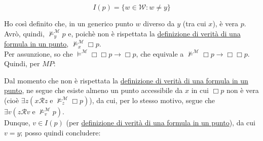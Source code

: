 \documentclass[a4paper,12pt]{article}
\begin{document}
\begin{dimo}
\begin{enumerate}
		      \begin{minipage}{0.48\textwidth}
			      $$I(p) = \{w \in \mathcal{W} : w \neq y\}$$
		      \end{minipage}
		      \begin{minipage}{0.48\textwidth}
			      \begin{center}
			      \end{center}
		      \end{minipage}
		      \vspace{8pt}

		      Ho così definito che, in un generico punto $w$ diverso da $y$ (tra cui $x$), è vera $p$. Avrò, quindi, $\nvDash_y^{\mathcal{M}} p$ e, poichè non è rispettata la \hyperlink{defverp}{definizione di verità di una formula in un punto}, $\nvDash_x^{\mathcal{M}} \Box p$. \\
		      Per assunzione, so che $\vDash^{\mathcal{M}}\Box \Box p \to \Box p$, che equivale a $\nvDash^{\mathcal{M}}\Box p \to \Box \Box p$. Quindi, per $M \! P$:
		      \begin{mathpar}
		      \end{mathpar}
		      Dal momento che non è rispettata la \hyperlink{defverp}{definizione di verità di una formula in un punto}, ne segue che esiste almeno un punto accessibile da $x$ in cui $\Box p$ non è vera (cioè $\exists z (x\mathcal{R}z \; \text{e} \; \nvDash_z^{\mathcal{M}} \Box p)$), da cui, per lo stesso motivo, segue che $\exists v(z\mathcal{R}v \; \text{e} \; \nvDash_v^{\mathcal{M}} p)$. \\
		      Dunque, $v \in I(p)$ (per \hyperlink{defverp}{definizione di verità di una formula in un punto}), da cui $v=y$; posso quindi concludere:


\end{enumerate}
\end{dimo}
\end{document}
